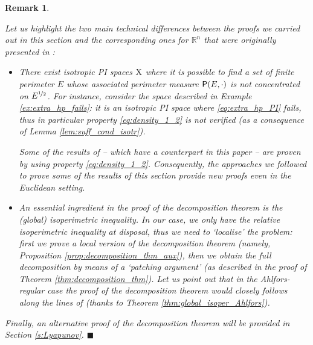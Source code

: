 \documentclass[reqno]{amsart}
\numberwithin{equation}{section}
\newcommand{\R}{\mathbb{R}}
\newcommand{\X}{{\rm X}}
\newcommand{\1}{\mathbbm 1}
\renewcommand{\P}{{\sf P}}
\newcommand{\fr}{\penalty-20\null\hfill\(\blacksquare\)}
\newtheorem{remark}[theorem]{Remark}
\begin{document}
%
%
\begin{remark}\label{rmk:difference_with_Rn}{\rm
Let us highlight the two main technical differences between the proofs
we carried out in this section and the corresponding ones for \(\R^n\)
that were originally presented in \cite{ACMM01}:
\begin{itemize}
\item[\(\rm i)\)] There exist isotropic PI spaces \(\X\) where it is possible
to find a set of finite perimeter \(E\) whose associated perimeter measure
\(\P(E,\cdot)\) is not concentrated on \(E^{\nicefrac{1}{2}}\). For instance,
consider the space described in Example \ref{ex:extra_hp_fails}: it is an isotropic
PI space where \eqref{eq:extra_hp_PI} fails, thus in particular property
\eqref{eq:density_1_2} is not verified
(as a consequence of Lemma \ref{lem:suff_cond_isotr}).

Some of the results of \cite{ACMM01} -- which have a counterpart
in this paper -- are proven by using property \eqref{eq:density_1_2}.
Consequently, the approaches we followed to prove some of the results of
this section provide new proofs even in the Euclidean setting.
\item[\(\rm ii)\)] An essential ingredient in the proof of the decomposition
theorem \cite[Theorem 1]{ACMM01} is the (global) isoperimetric inequality.
In our case, we only have the relative isoperimetric inequality at disposal,
thus we need to `localise' the problem: first we prove a local version of the
decomposition theorem (namely, Proposition \ref{prop:decomposition_thm_aux}),
then we obtain the full decomposition by means of a `patching argument'
(as described in the proof of Theorem \ref{thm:decomposition_thm}).
Let us point out that in the Ahlfors-regular case the proof of the
decomposition theorem would closely follows along the lines of \cite[Theorem 1]{ACMM01}  
(thanks to Theorem \ref{thm:global_isoper_Ahlfors}).
\end{itemize}
Finally, an alternative proof of the decomposition theorem will be provided in
Section \ref{s:Lyapunov}.
\fr}\end{remark}
%
%
%
%
\end{document}
